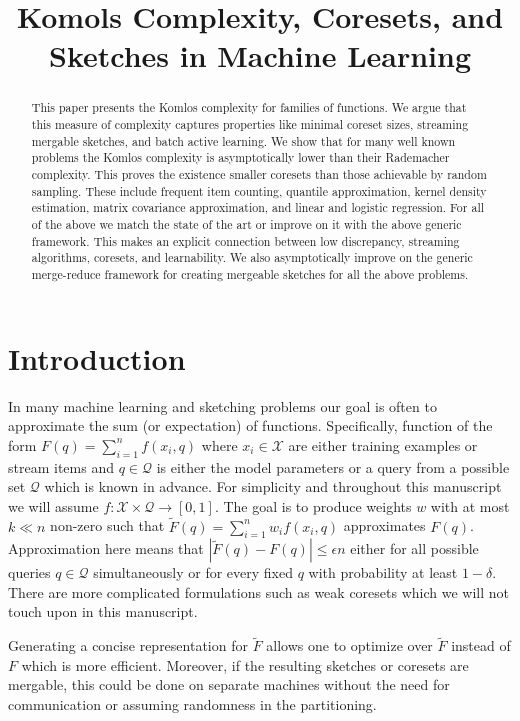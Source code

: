 \documentclass[anon,12pt]{colt2019} %
\title[Komols Complexity, Coresets, and Sketches in Machine Learning]{Komols Complexity, Coresets, and Sketches in Machine Learning}
\newcommand{\eps}{\epsilon}
\newcommand{\X}{\mathcal{X}}
\newcommand{\Q}{\mathcal{Q}}
\begin{document}
\maketitle

\begin{abstract}
This paper presents the Komlos complexity for families of functions.
We argue that this measure of complexity captures properties like minimal coreset sizes, streaming mergable sketches, and batch active learning.  
We show that for many well known problems the Komlos complexity is asymptotically lower than their Rademacher complexity.
This proves the existence smaller coresets than those achievable by random sampling. 
These include frequent item counting, quantile approximation, kernel density estimation, matrix covariance approximation, and linear and logistic regression.
For all of the above we match the state of the art or improve on it with the above generic framework.
This makes an explicit connection between low discrepancy, streaming algorithms, coresets, and learnability. 
We also asymptotically improve on the generic merge-reduce framework for creating mergeable sketches for all the above problems. 
\end{abstract}


\section{Introduction}

In many machine learning and sketching problems our goal is often to approximate the sum (or expectation) of functions.
Specifically, function of the form $F(q) = \sum_{i=1}^{n} f(x_i, q)$ where $x_i \in \mathcal X$ are either training examples or stream items and $q \in \mathcal Q$ is either the model parameters or a query from a possible set $\Q$ which is known in advance. For simplicity and throughout this manuscript we will assume $f:\X\times\Q\rightarrow [0,1]$.
The goal is to produce weights $w$ with at most $k \ll n$ non-zero such that $\tilde F(q) = \sum_{i=1}^{n}w_i f(x_i,q)$ approximates $F(q)$.
Approximation here means that $|\tilde F(q)  - F(q)| \le \eps n$ either for all possible queries $q \in \mathcal Q$ simultaneously or for every fixed $q$ with probability at least $1-\delta$. 
There are more complicated formulations such as weak coresets which we will not touch upon in this manuscript.

Generating a concise representation for $\tilde F$ allows one to optimize over $\tilde F$ instead of $F$ which is more efficient. 
Moreover, if the resulting sketches or coresets are mergable, this could be done on separate machines without the need for communication or assuming randomness in the partitioning.
\end{document}

